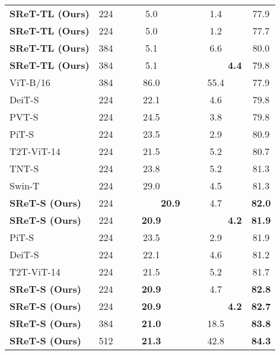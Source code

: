 \documentclass[runningheads]{llncs}
\begin{document}
\begin{table*}[t]
{{\begin{tabular}{l|c|c|c|c}
					\bf SReT-TL (Ours) &  224    &  5.0   &   1.4    &   77.9    \\ 
					\bf SReT-TL (Ours) &  224    &  5.0   &   1.2    &   77.7    \\ 
					\rowcolor{mygraylite} \bf SReT-TL (Ours) &  384   &   5.1  &    6.6    &  80.0     \\ \rowcolor{mygraylite} \bf SReT-TL (Ours) &  384   &   5.1  &   \bf ~~~~~~~4.4    &   79.8    \\ \hline \hline
					ViT-B/16~\cite{dosovitskiy2021an} & 384   &   86.0  &  55.4    &   77.9   \\ 
					DeiT-S~\cite{touvron2020training}  & 224   &   22.1  &  4.6     &   79.8    \\ 
					PVT-S~\cite{wang2021pyramid} & 224    & 24.5 &    3.8   &   79.8   \\ 
					PiT-S~\cite{heo2021rethinking} &  224    &  23.5   &   2.9    &   80.9      \\ 
					T2T-ViT-14~\cite{yuan2021tokens} &  224    &  21.5  & 5.2  &  80.7    \\ 
					TNT-S~\cite{han2021transformer} &  224    &  23.8   &   5.2    &   81.3    \\ 
					Swin-T~\cite{liu2021swin} &  224    &  29.0   &   4.5    &   81.3    \\ 
					\bf SReT-S (Ours) &  224   & \bf   ~~~~~~~20.9  &   4.7    & \bf 82.0    \\ 
					\bf SReT-S (Ours) &  224   & \bf  20.9  &   \bf ~~~~~~~4.2   & \bf  81.9   \\ \hline
					PiT-S~\cite{heo2021rethinking} &  224    &  23.5   &   2.9   &   81.9    \\ 
					DeiT-S~\cite{touvron2020training}  & 224   &   22.1  &    4.6   &   81.2    \\ 
					T2T-ViT-14~\cite{yuan2021tokens} &  224    &  21.5   &  5.2     &   81.7      \\ 
					\bf SReT-S (Ours) &  224   &  \bf 20.9  &     4.7   & \bf 82.8    \\ 
					\bf SReT-S (Ours) &  224   &  \bf 20.9  &    \bf ~~~~~~~4.2     & \bf  82.7   \\ \hline
					\rowcolor{mygraylite} \bf SReT-S (Ours) &  384   &  \bf 21.0  &   18.5     & \bf   83.8  \\ 
					\rowcolor{mygray} \bf SReT-S (Ours) &  512   &  \bf 21.3  &   42.8  & \bf  84.3   \\ 
					\bottomrule
		\end{tabular}}}  \vspace{-0.08in}
	\end{table*}
	
\end{document}
